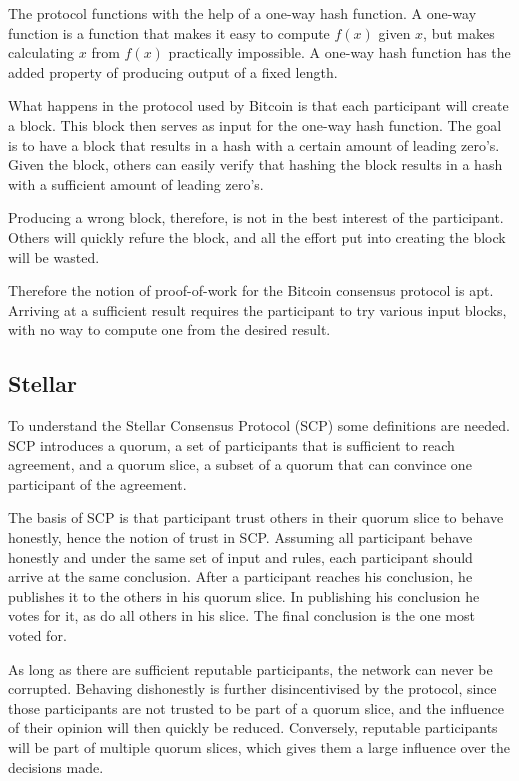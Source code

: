 The protocol functions with the help of a one-way hash function. A one-way function is a function that makes it easy to compute $f(x)$ given $x$, but makes calculating $x$ from $f(x)$ practically impossible. A one-way hash function has the added property of producing output of a fixed length.

What happens in the protocol used by Bitcoin is that each participant will create a block. This block then serves as input for the one-way hash function. The goal is to have a block that results in a hash with a certain amount of leading zero's. Given the block, others can easily verify that hashing the block results in a hash with a sufficient amount of leading zero's.

Producing a wrong block, therefore, is not in the best interest of the participant. Others will quickly refure the block, and all the effort put into creating the block will be wasted.

Therefore the notion of proof-of-work for the Bitcoin consensus protocol is apt. Arriving at a sufficient result requires the participant to try various input blocks, with no way to compute one from the desired result.

\subsection{Stellar}
To understand the Stellar Consensus Protocol \cite{StellarConsensus} (SCP) some definitions are needed. SCP introduces a quorum, a set of participants that is sufficient to reach agreement, and a quorum slice, a subset of a quorum that can convince one participant of the agreement.

The basis of SCP is that participant trust others in their quorum slice to behave honestly, hence the notion of trust in SCP. Assuming all participant behave honestly and under the same set of input and rules, each participant should arrive at the same conclusion. After a participant reaches his conclusion, he publishes it to the others in his quorum slice. In publishing his conclusion he votes for it, as do all others in his slice. The final conclusion is the one most voted for.

As long as there are sufficient reputable participants, the network can never be corrupted. Behaving dishonestly is further disincentivised by the protocol, since those participants are not trusted to be part of a quorum slice, and the influence of their opinion will then quickly be reduced. Conversely, reputable participants will be part of multiple quorum slices, which gives them a large influence over the decisions made.

